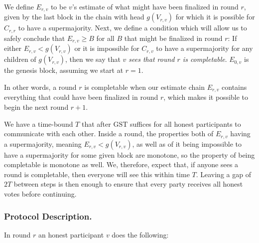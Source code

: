 \documentclass[a4paper,UKenglish,cleveref, autoref, thm-restate, anonymous]{lipics-v2019}
\def\GST{\mathrm{GST}}
\begin{document}
We define $E_{r,v}$ to be $v$'s estimate of what might have been finalized in round $r$, given by the last block in the chain with head $g(V_{r,v})$ for which it is possible for $C_{r,r}$ to have a supermajority. Next, we define a condition which will allow us to safely conclude that $E_{r,v} \geq B$ for all $B$ that might be finalized in round $r$:
If either $E_{r,v} < g(V_{r,v})$ or it is impossible for $C_{r,v}$ to have a supermajority for any children of $g(V_{r,v})$, then we say that {\em $v$ sees that round $r$ is completable}.  $E_{0,v}$ is the genesis block, assuming we start at $r=1$.  

In other words, a round $r$ is completable when our estimate chain $E_{r,v}$ contains everything that could have been finalized in round $r$, which makes it possible to begin the next round $r+1$.

We have a time-bound $T$ that after $\GST$ suffices for all honest participants to communicate with each other.
Inside a round, the properties both of $E_{r,v}$ having a supermajority, meaning $E_{r,v} < g(V_{r,v})$, as well as of it being impossible to have a supermajority for some given block are monotone, so the property of being completable is monotone as well.
We, therefore, expect that, if anyone sees a round is completable, then everyone will see this within time $T$. Leaving a gap of $2T$ between steps is then enough to ensure that every party receives all honest votes before continuing.


\subsubsection{Protocol Description.}
In round $r$ an honest participant $v$ does the following:
\end{document}
